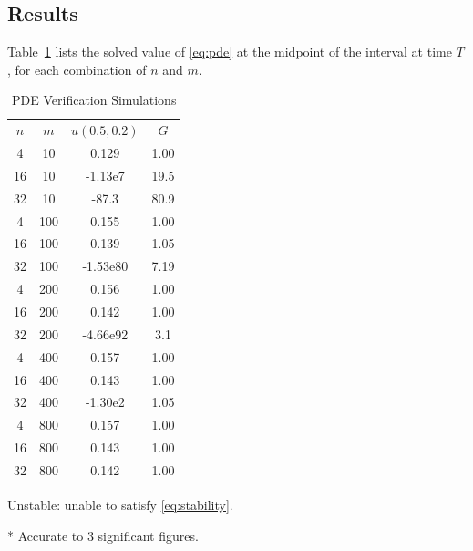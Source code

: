 \documentclass[a4paper,12pt,twocolumn]{article}
\begin{document}
\vspace{-\baselineskip}
\subsection{Results}

Table~\ref{table:pde} lists the solved value of \eqref{eq:pde} at the midpoint
of the interval at time $T$, for each combination of $n$ and $m$.

\begin{table}[h]
    \centering
    \footnotesize
    \vspace{-0.5\baselineskip}
    \caption{PDE Verification Simulations}
    \label{table:pde}
    \vspace{-0.5\baselineskip}
    \begin{threeparttable}
        \begin{tabular}{
            S[table-format=2]
            S[table-format=3]
            S[table-format=+2.2e2]
            S[table-format=2.2e+1]
        }
            \toprule
            {$n$} & {$m$} & {$u(0.5,0.2)$\tnote{*}} & {$G$\tnote{*}}\\
            \cmidrule(r){1-3}\cmidrule(l){4-4}
             4 &  10 &    0.129   &  1.00 \\
            16 &  10 &   -1.13e7  & 19.5  \\
            32 &  10 &  -87.3     & 80.9  \\
             4 & 100 &    0.155   &  1.00 \\
            16 & 100 &    0.139   &  1.05 \\
            32 & 100 &   -1.53e80 &  7.19 \\
             4 & 200 &    0.156   &  1.00 \\
            16 & 200 &    0.142   &  1.00 \\
            32 & 200 &   -4.66e92 &  3.1  \\
             4 & 400 &    0.157   &  1.00 \\
            16 & 400 &    0.143   &  1.00 \\
            32 & 400 &   -1.30e2  &  1.05 \\
             4 & 800 &    0.157   &  1.00 \\
            16 & 800 &    0.143   &  1.00 \\
            32 & 800 &    0.142   &  1.00 \\
            \bottomrule
        \end{tabular}
        \begin{tablenotes}
            \item\colorbox{red!20}{Unstable: unable to satisfy
                \eqref{eq:stability}.}
            \item[*] Accurate to 3 significant figures.
        \end{tablenotes}
    \end{threeparttable}
    \vspace{-\baselineskip}
\end{table}
\end{document}
